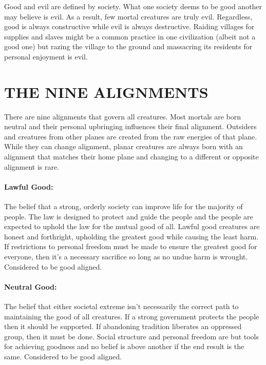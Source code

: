 \begin{multicols}{2}
Good and evil are defined by society.  What one society deems to be good another may believe is evil.  As a result, few mortal creatures are truly evil.  Regardless, good is always constructive while evil is always destructive.  Raiding villages for supplies and slaves might be a common practice in one civilization (albeit not a good one) but razing the village to the ground and massacring its residents for personal enjoyment is evil.  

\section{THE NINE ALIGNMENTS}

There are nine alignments that govern all creatures.  Most mortals are born neutral and their personal upbringing influences their final alignment.  Outsiders and creatures from other planes are created from the raw energies of that plane.  While they can change alignment, planar creatures are always born with an alignment that matches their home plane and changing to a different or opposite alignment is rare.

\paragraph{Lawful Good:} The belief that a strong, orderly society can improve life for the majority of people.  The law is designed to protect and guide the people and the people are expected to uphold the law for the mutual good of all.  Lawful good creatures are honest and forthright, upholding the greatest good while causing the least harm.  If restrictions to personal freedom must be made to ensure the greatest good for everyone, then it's a necessary sacrifice so long as no undue harm is wrought.  Considered to be good aligned.

\paragraph{Neutral Good:}  The belief that either societal extreme isn't necessarily the correct path to maintaining the good of all creatures.  If a strong government protects the people then it should be supported.  If abandoning tradition liberates an oppressed group, then it must be done.  Social structure and personal freedom are but tools for achieving goodness and no belief is above another if the end result is the same.  Considered to be good aligned.


\end{multicols}
